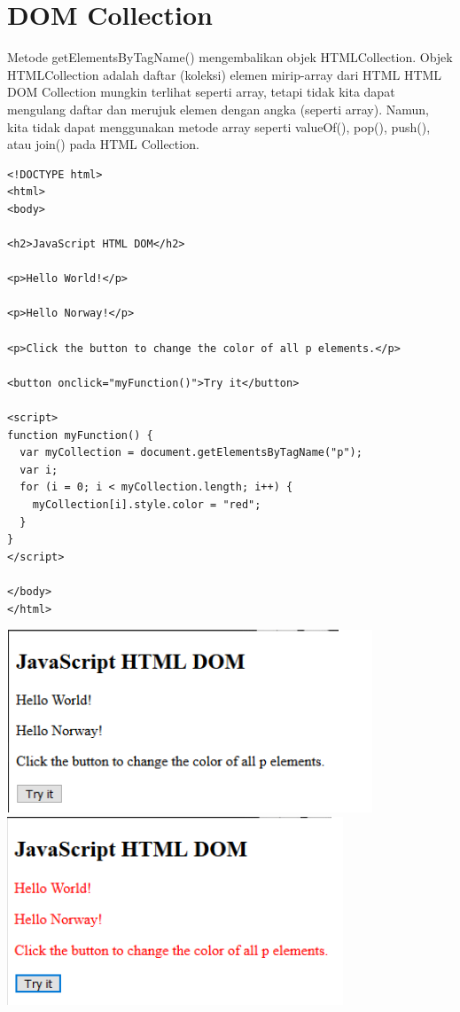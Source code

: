 \documentclass[a4paper,12pt]{article}
\begin{document}
\section*{DOM Collection}
Metode getElementsByTagName() mengembalikan objek HTMLCollection. Objek HTMLCollection adalah daftar (koleksi) elemen mirip-array dari HTML 
HTML DOM Collection mungkin terlihat seperti array, tetapi tidak kita dapat mengulang daftar dan merujuk elemen dengan angka (seperti array). Namun, kita tidak dapat menggunakan metode array seperti valueOf(), pop(), push(), atau join() pada HTML Collection.
\begin{lstlisting}
<!DOCTYPE html>
<html>
<body>

<h2>JavaScript HTML DOM</h2>

<p>Hello World!</p>

<p>Hello Norway!</p>

<p>Click the button to change the color of all p elements.</p>

<button onclick="myFunction()">Try it</button>

<script>
function myFunction() {
  var myCollection = document.getElementsByTagName("p");
  var i;
  for (i = 0; i < myCollection.length; i++) {
    myCollection[i].style.color = "red";
  }
}
</script>

</body>
</html>
\end{lstlisting}
\begin{center}
    \includegraphics[scale=.7]{col1.png} 
    \includegraphics[scale=.7]{col2.png} 
\end{center}
\end{document}
